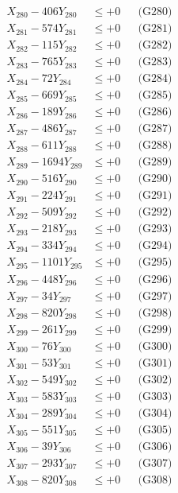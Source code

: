 \documentclass[a4paper,10pt]{article}
\begin{document}
{\begin{align}
X_{280} - 406Y_{280} &\leq +0 && \text{(G280)} \\
\allowbreak
X_{281} - 574Y_{281} &\leq +0 && \text{(G281)} \\
X_{282} - 115Y_{282} &\leq +0 && \text{(G282)} \\
X_{283} - 765Y_{283} &\leq +0 && \text{(G283)} \\
X_{284} - 72Y_{284} &\leq +0 && \text{(G284)} \\
X_{285} - 669Y_{285} &\leq +0 && \text{(G285)} \\
X_{286} - 189Y_{286} &\leq +0 && \text{(G286)} \\
X_{287} - 486Y_{287} &\leq +0 && \text{(G287)} \\
X_{288} - 611Y_{288} &\leq +0 && \text{(G288)} \\
X_{289} - 1694Y_{289} &\leq +0 && \text{(G289)} \\
X_{290} - 516Y_{290} &\leq +0 && \text{(G290)} \\
\allowbreak
X_{291} - 224Y_{291} &\leq +0 && \text{(G291)} \\
X_{292} - 509Y_{292} &\leq +0 && \text{(G292)} \\
X_{293} - 218Y_{293} &\leq +0 && \text{(G293)} \\
X_{294} - 334Y_{294} &\leq +0 && \text{(G294)} \\
X_{295} - 1101Y_{295} &\leq +0 && \text{(G295)} \\
X_{296} - 448Y_{296} &\leq +0 && \text{(G296)} \\
X_{297} - 34Y_{297} &\leq +0 && \text{(G297)} \\
X_{298} - 820Y_{298} &\leq +0 && \text{(G298)} \\
X_{299} - 261Y_{299} &\leq +0 && \text{(G299)} \\
X_{300} - 76Y_{300} &\leq +0 && \text{(G300)} \\
\allowbreak
X_{301} - 53Y_{301} &\leq +0 && \text{(G301)} \\
X_{302} - 549Y_{302} &\leq +0 && \text{(G302)} \\
X_{303} - 583Y_{303} &\leq +0 && \text{(G303)} \\
X_{304} - 289Y_{304} &\leq +0 && \text{(G304)} \\
X_{305} - 551Y_{305} &\leq +0 && \text{(G305)} \\
X_{306} - 39Y_{306} &\leq +0 && \text{(G306)} \\
X_{307} - 293Y_{307} &\leq +0 && \text{(G307)} \\
X_{308} - 820Y_{308} &\leq +0 && \text{(G308)} \\

\end{align}}
\end{document}
